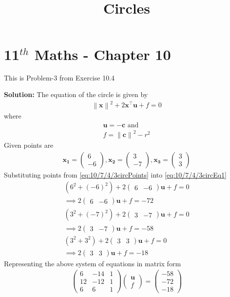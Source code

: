 \documentclass[12pt]{article}
\providecommand{\brak}[1]{\ensuremath{\left(#1\right)}}
\providecommand{\norm}[1]{\left\lVert#1\right\rVert}
\newcommand{\solution}{\noindent \textbf{Solution: }}
\newcommand{\myvec}[1]{\ensuremath{\begin{pmatrix}#1\end{pmatrix}}}
\let\vec\mathbf
\begin{document}
\begin{center}
\title{\textbf{Circles}}
\date{\vspace{-5ex}} %
\maketitle
\end{center}
\setcounter{page}{1}

\section{11$^{th}$ Maths - Chapter 10}
This is Problem-3 from Exercise 10.4
\begin{enumerate}
\fi
\solution 
The equation of the circle is given by 
\begin{align}
	\label{eq:10/7/4/3circEq1}
	\norm{\vec{x}}^2+2\vec{x}^\top\vec{u}+f = 0 
\end{align}
where
\begin{align}
	\vec{u} = -\vec{c} \text{ and } \\
        \label{eq:10/7/4/3fRelation}
	f = \norm{\vec{c}}^2 - r^2
\end{align}
Given points are 
\begin{align}
	\label{eq:10/7/4/3circPoints}
     \vec{x_1} = \myvec{6 \\ -6} , \vec{x_2} = \myvec{3 \\-7}, \vec{x_3}= \myvec{3 \\ 3}
\end{align}
Substituting points from \eqref{eq:10/7/4/3circPoints} into \eqref{eq:10/7/4/3circEq1}
\begin{align}
	\brak{6^2 + \brak{-6}^2}+2\myvec{6 & -6}\vec{u}+f = 0 \\ 
	\implies 2\myvec{6 & -6}\vec{u} + f = -72 \\ 
	\brak{3^2 + \brak{-7}^2}+2\myvec{3 & -7}\vec{u}+f = 0 \\ 
	\implies 2\myvec{3 & -7}\vec{u} + f = -58 \\
	\brak{3^2 + 3^2}+2\myvec{3 & 3}\vec{u}+f = 0 \\ 
	\implies 2\myvec{3 & 3}\vec{u} + f = -18 
\end{align}
Representing the above system of equations in matrix form
\begin{align}
 \myvec{6 & -14 & 1 \\
	12 & -12 & 1 \\
	6 & 6 & 1
	} \myvec {\vec{u} \\
	           f 
		}  = \myvec{-58 \\ -72 \\ -18 }
\end{align}


\end{enumerate}
\end{document}
